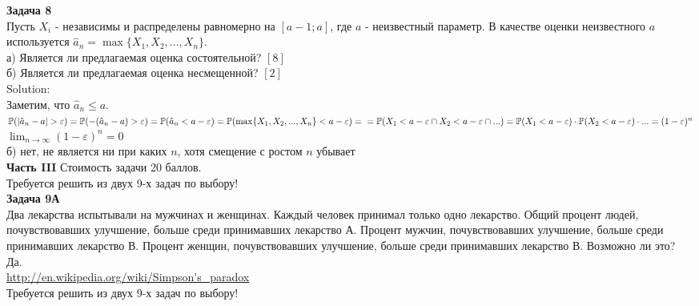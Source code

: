 \documentclass[pdftex,12pt,a4paper]{article}
\begin{document}
\textbf{Задача 8} \\ %
Пусть $X_{i}$ - независимы и распределены равномерно на $[a-1;a]$, где $a$ - неизвестный параметр. В качестве оценки неизвестного $a$ используется $\hat{a}_{n}=\max\{X_{1},X_{2},...,X_{n}\}$. \\
а) Является ли предлагаемая оценка состоятельной? $[8]$ \\
б) Является ли предлагаемая оценка несмещенной? $[2]$ \\
Solution: \\
Заметим, что $\hat{a}_{n}\leq a$. \\
$\P(|\hat{a}_{n}-a|>\varepsilon)=\P(-(\hat{a}_{n}-a)>\varepsilon)=\P(\hat{a}_{n}<a-\varepsilon)=\P(\max\{X_{1},X_{2},...,X_{n}\}<a-\varepsilon)= \\
=\P(X_{1}<a-\varepsilon \cap X_{2}< a-\varepsilon\cap ...)=
\P(X_{1}<a-\varepsilon)\cdot \P(X_{2}<a-\varepsilon)\cdot ...=(1-\varepsilon)^{n}$ \\
$\lim_{n\to\infty} (1-\varepsilon)^{n} =0$ \\
б) нет, не является ни при каких $n$, хотя смещение с ростом $n$ убывает \\


\textbf{Часть III} Стоимость задачи 20 баллов. \\

Требуется решить \textbf{} из двух 9-х задач по
выбору! \\


\textbf{Задача 9А} \\
Два лекарства испытывали на мужчинах и женщинах. Каждый
человек принимал только одно лекарство. Общий процент людей,
почувствовавших улучшение, больше среди принимавших лекарство А.
Процент мужчин, почувствовавших улучшение, больше среди принимавших лекарство В. Процент женщин, почувствовавших улучшение, больше среди принимавших лекарство В. Возможно ли это? \\
Да. \\
\url{http://en.wikipedia.org/wiki/Simpson's_paradox} \\

Требуется решить \textbf{} из двух 9-х задач по
выбору! \\
\end{document}
